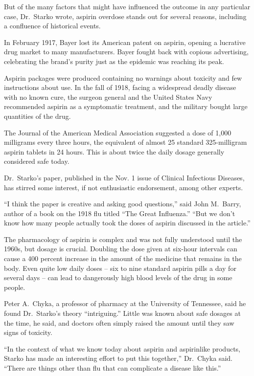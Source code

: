 ﻿\documentclass[12pt]{article}
\begin{document}
But of the many factors that might have influenced the outcome in any particular case, Dr.~Starko
wrote, aspirin overdose stands out for several reasons, including a confluence of historical events.

In February 1917, Bayer lost its American patent on aspirin, opening a lucrative drug market to many
manufacturers. Bayer fought back with copious advertising, celebrating the brand's purity just as
the epidemic was reaching its peak.

Aspirin packages were produced containing no warnings about toxicity and few instructions about use.
In the fall of 1918, facing a widespread deadly disease with no known cure, the surgeon general and
the United States Navy recommended aspirin as a symptomatic treatment, and the military bought large
quantities of the drug.

The Journal of the American Medical Association suggested a dose of 1,000 milligrams every three
hours, the equivalent of almost 25 standard 325-milligram aspirin tablets in 24 hours. This is about
twice the daily dosage generally considered safe today.

Dr.~Starko's paper, published in the Nov. 1 issue of Clinical Infectious Diseases, has stirred some
interest, if not enthusiastic endorsement, among other experts.

``I think the paper is creative and asking good questions,'' said John M.~Barry, author of a book on
the 1918 flu titled ``The Great Influenza.'' ``But we don't know how many people actually took the
doses of aspirin discussed in the article.''

The pharmacology of aspirin is complex and was not fully understood until the 1960s, but dosage is
crucial. Doubling the dose given at six-hour intervals can cause a 400 percent increase in the
amount of the medicine that remains in the body. Even quite low daily doses -- six to nine standard
aspirin pills a day for several days -- can lead to dangerously high blood levels of the drug in
some people.

Peter A.~Chyka, a professor of pharmacy at the University of Tennessee, said he found Dr.~Starko's
theory ``intriguing.'' Little was known about safe dosages at the time, he said, and doctors often
simply raised the amount until they saw signs of toxicity.

``In the context of what we know today about aspirin and aspirinlike products, Starko has made an
interesting effort to put this together,'' Dr.~Chyka said. ``There are things other than flu that
can complicate a disease like this.''
\end{document}
